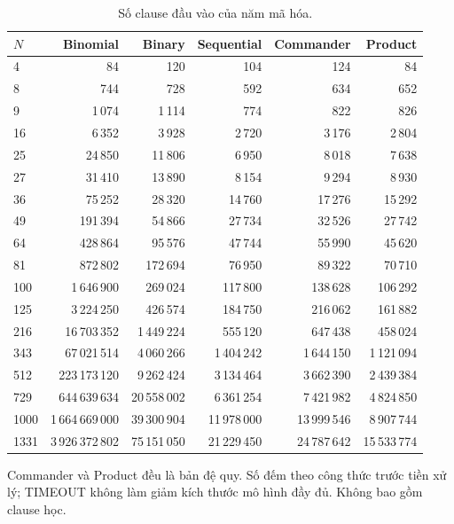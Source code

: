 \begin{table}[pos=H]
\centering
\footnotesize
\caption{Số clause đầu vào của năm mã hóa.}
\label{tab:clauses}
\setlength{\tabcolsep}{4pt}
\begin{tabular}{@{}lrrrrr@{}}
\toprule
$N$ & Binomial & Binary & Sequential & Commander & Product \\
\midrule
4 & 84 & 120 & 104 & 124 & 84 \\
8 & 744 & 728 & 592 & 634 & 652 \\
9 & 1\,074 & 1\,114 & 774 & 822 & 826 \\
16 & 6\,352 & 3\,928 & 2\,720 & 3\,176 & 2\,804 \\
25 & 24\,850 & 11\,806 & 6\,950 & 8\,018 & 7\,638 \\
27 & 31\,410 & 13\,890 & 8\,154 & 9\,294 & 8\,930 \\
36 & 75\,252 & 28\,320 & 14\,760 & 17\,276 & 15\,292 \\
49 & 191\,394 & 54\,866 & 27\,734 & 32\,526 & 27\,742 \\
64 & 428\,864 & 95\,576 & 47\,744 & 55\,990 & 45\,620 \\
81 & 872\,802 & 172\,694 & 76\,950 & 89\,322 & 70\,710 \\
100 & 1\,646\,900 & 269\,024 & 117\,800 & 138\,628 & 106\,292 \\
125 & 3\,224\,250 & 426\,574 & 184\,750 & 216\,062 & 161\,882 \\
216 & 16\,703\,352 & 1\,449\,224 & 555\,120 & 647\,438 & 458\,024 \\
343 & 67\,021\,514 & 4\,060\,266 & 1\,404\,242 & 1\,644\,150 & 1\,121\,094 \\
512 & 223\,173\,120 & 9\,262\,424 & 3\,134\,464 & 3\,662\,390 & 2\,439\,384 \\
729 & 644\,639\,634 & 20\,558\,002 & 6\,361\,254 & 7\,421\,982 & 4\,824\,850 \\
1000 & 1\,664\,669\,000 & 39\,300\,904 & 11\,978\,000 & 13\,999\,546 & 8\,907\,744 \\
1331 & 3\,926\,372\,802 & 75\,151\,050 & 21\,229\,450 & 24\,787\,642 & 15\,533\,774 \\
\bottomrule
\end{tabular}
\par\smallskip\begin{minipage}{\linewidth}\footnotesize Commander và Product đều là bản đệ quy. Số đếm theo công thức trước tiền xử lý; TIMEOUT không làm giảm kích thước mô hình đầy đủ. Không bao gồm clause học.\end{minipage}
\end{table}
